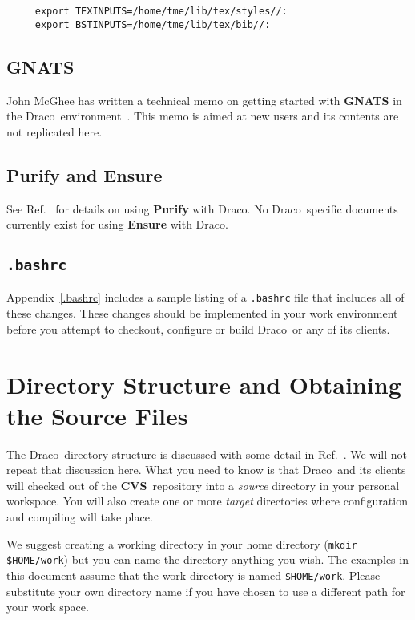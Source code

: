 \documentclass[11pt]{nmemo}
\newcommand{\comp}[1]{\normalfont\normalsize\texttt{#1}}
\newcommand{\draco}{{\normalfont\sffamily Draco}}
\newcommand{\cvs}{{\normalfont\bfseries CVS}}
\begin{document}
\begin{verbatim}
     export TEXINPUTS=/home/tme/lib/tex/styles//: 
     export BSTINPUTS=/home/tme/lib/tex/bib//:
\end{verbatim} %

\subsection{GNATS}

John McGhee has written a technical memo on getting started with
\textbf{GNATS} in the \draco\ environment~\cite{draco-gnats}.  This
memo is aimed at new users and its contents are not replicated here.

\subsection{Purify and Ensure}

See Ref.~\cite{draco-purify} for details on using \textbf{Purify} with 
\draco.  No \draco\ specific documents currently exist for using
\textbf{Ensure} with \draco.

\subsection{\comp{.bashrc}}

Appendix~\ref{.bashrc} includes a sample listing of a \comp{.bashrc}
file that includes all of these changes.  These changes should be
implemented in your work environment before you attempt to checkout,
configure or build \draco\ or any of its clients.


\section{Directory Structure and Obtaining the Source Files}

The \draco\ directory structure is discussed with some detail in
Ref.~\cite{draco-build}.  We will not repeat that discussion here.
What you need to know is that \draco\ and its clients will checked out 
of the \cvs\ repository into a \emph{source} directory in your
personal workspace.  You will also create one or more \emph{target}
directories where configuration and compiling will take place.

We suggest creating a working directory in your home directory
(\comp{mkdir \${HOME}/work}) but you can name the directory anything
you wish.  The examples in this document assume that the work
directory is named \comp{\${HOME}/work}.  Please substitute your own
directory name if you have chosen to use a different path for your
work space.
\end{document}
